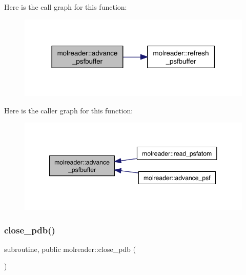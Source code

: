 Here is the call graph for this function\+:\nopagebreak
\begin{figure}[H]
\begin{center}
\leavevmode
\includegraphics[width=318pt]{namespacemolreader_abf243c87d2f9429f3ed94293d438c7c7_cgraph}
\end{center}
\end{figure}
Here is the caller graph for this function\+:\nopagebreak
\begin{figure}[H]
\begin{center}
\leavevmode
\includegraphics[width=348pt]{namespacemolreader_abf243c87d2f9429f3ed94293d438c7c7_icgraph}
\end{center}
\end{figure}
\mbox{\label{namespacemolreader_a5aafbdb9b4afbb96bdc20ae58d547699}} 
\subsubsection{\texorpdfstring{close\+\_\+pdb()}{close\_pdb()}}
{\footnotesize\ttfamily subroutine, public molreader\+::close\+\_\+pdb (\begin{DoxyParamCaption}{ }\end{DoxyParamCaption})}

\mbox{\label{namespacemolreader_aac446b95d6c274d93e11e45286e60e4d}} 
